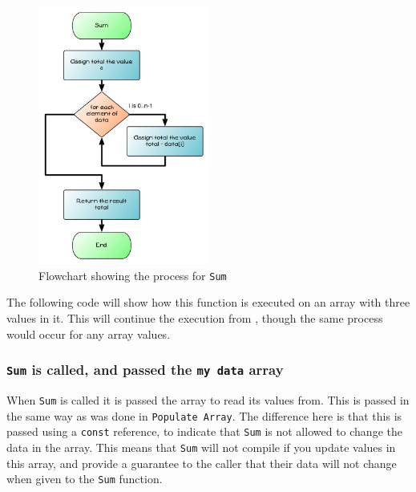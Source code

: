 \begin{figure}[htbp]
   \centering
   \includegraphics[width=0.5\textwidth]{./topics/arrays/diagrams/SumFlow} 
   \caption{Flowchart showing the process for \texttt{Sum}}
   \label{fig:sum-understanding}
\end{figure}

The following code will show how this function is executed on an array with three values in it. This will continue the execution from  , though the same process would occur for any array values.


\clearpage
\subsubsection{\texttt{Sum} is called, and passed the \texttt{my data} array} %
\label{ssub:sum_is_called_and_passed_the_values_in_my_data}

When \texttt{Sum} is called it is passed the array to read its values from. This is passed in the same way as was done in \texttt{Populate Array}. The difference here is that this is passed using a \texttt{const} reference, to indicate that \texttt{Sum} is not allowed to change the data in the array. This means that \texttt{Sum} will not compile if you update values in this array, and provide a guarantee to the caller that their data will not change when given to the \texttt{Sum} function. 

